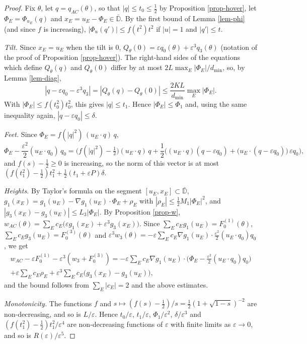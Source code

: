 \documentclass[a4paper,11pt,twoside,leqno]{article}
\newcommand{\eps}[0]{\varepsilon}
\numberwithin{equation}{section}
\begin{document}
\begin{proof}
Fix $\theta$, let $q = q_{AC}(\theta)$, so that $|q| \leq t_0 \leq \frac{1}{2}$ by Proposition \ref{prop-hover}, let $\Phi_E = \Phi_{u_E}(q)$ and $x_E = u_E - \Phi_E \in \bar{\mathbb{D}}$. By the first bound of Lemma \ref{lem-phi} (and since $f$ is increasing), $|\Phi_u(q')| \leq f(t^2) t^2$ if $|u| = 1$ and $|q'| \leq t$.

\emph{Tilt.} Since $x_E = u_E$ when the tilt is $0$, $Q_\theta(0) = \eps q_0(\theta) + \eps^3 q_3(\theta)$ (notation of the proof of Proposition \ref{prop-hover}). The right-hand sides of the equations which define $Q_\theta(q)$ and $Q_\theta(0)$ differ by at most $2L \max_E |\Phi_E| / d_{\min}$, so, by Lemma \ref{lem-diag},
\[
|q - \eps q_0 - \eps^3 q_3| = |Q_\theta(q) - Q_\theta(0)| \leq \frac{2KL}{d_{\min}} \max_E |\Phi_E|.
\]
With $|\Phi_E| \leq f(t_0^2) t_0^2$, this gives $|q| \leq t_1$. Hence $|\Phi_E| \leq \Phi_1$ and, using the same inequality again, $|q - \eps q_0| \leq \delta$.

\emph{Feet.} Since $\Phi_E = f(|q|^2)\,(u_E\cdot q)\, q$,
\[
\Phi_E - \frac{\eps^2}{2}(u_E \cdot q_0)\, q_0 = \big(f(|q|^2) - \tfrac{1}{2}\big)(u_E\cdot q)\, q + \frac{1}{2}\Big( (u_E \cdot q)(q - \eps q_0) + \big(u_E \cdot (q - \eps q_0)\big)\, \eps q_0 \Big),
\]
and $f(s) - \frac{1}{2} \geq 0$ is increasing, so the norm of this vector is at most $(f(t_1^2) - \frac{1}{2}) t_1^2 + \frac{1}{2}(t_1 + \eps P)\delta$.

\emph{Heights.} By Taylor's formula on the segment $[u_E, x_E] \subset \bar{\mathbb{D}}$, $g_1(x_E) = g_1(u_E) - \nabla g_1(u_E)\cdot \Phi_E + \rho_E$ with $|\rho_E| \leq \frac{1}{2} M_1 |\Phi_E|^2$, and $|g_3(x_E) - g_3(u_E)| \leq L_3 |\Phi_E|$. By Proposition \ref{prop-w}, $w_{AC}(\theta) = \sum_E c_E \big( \eps g_1(x_E) + \eps^3 g_3(x_E) \big)$. Since $\sum_E c_E g_1(u_E) = F_0^{(1)}(\theta)$, $\sum_E c_E g_3(u_E) = F_0^{(3)}(\theta)$ and $\eps^3 w_3(\theta) = -\eps \sum_E c_E \nabla g_1(u_E) \cdot \frac{\eps^2}{2}(u_E\cdot q_0) q_0$, we get
\begin{multline*}
w_{AC} - \eps F_0^{(1)} - \eps^3 (w_3 + F_0^{(3)})
= - \eps \sum_E c_E \nabla g_1(u_E) \cdot \Big(\Phi_E - \frac{\eps^2}{2}(u_E\cdot q_0) q_0\Big) \\
+ \eps \sum_E c_E \rho_E + \eps^3 \sum_E c_E \big(g_3(x_E) - g_3(u_E)\big),
\end{multline*}
and the bound follows from $\sum_E |c_E| = 2$ and the above estimates.

\emph{Monotonicity.} The functions $f$ and $s \mapsto (f(s) - \frac{1}{2})/s = \frac{1}{2}(1+\sqrt{1-s})^{-2}$ are non-decreasing, and so is $L/\eps$. Hence $t_0/\eps$, $t_1/\eps$, $\Phi_1/\eps^2$, $\delta/\eps^3$ and $(f(t_1^2) - \frac{1}{2})t_1^2/\eps^4$ are non-decreasing functions of $\eps$ with finite limits as $\eps \to 0$, and so is $R(\eps)/\eps^5$.
\end{proof}
\end{document}
